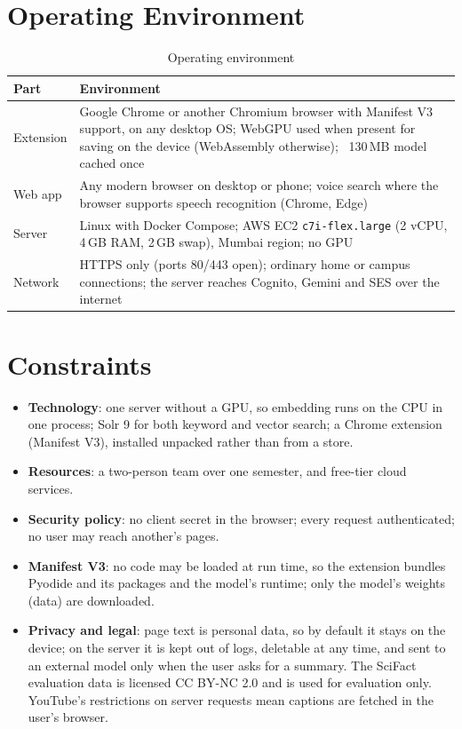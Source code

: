 \section{Operating Environment}

\begin{table}[H]
\centering
\small
\begin{tabularx}{\textwidth}{>{\raggedright\arraybackslash}p{} L}
\toprule
\textbf{Part} & \textbf{Environment} \\
\midrule
Extension & Google Chrome or another Chromium browser with Manifest V3 support, on any desktop OS; WebGPU used when present for saving on the device (WebAssembly otherwise); ~130\,MB model cached once \\
Web app & Any modern browser on desktop or phone; voice search where the browser supports speech recognition (Chrome, Edge) \\
Server & Linux with Docker Compose; AWS EC2 \texttt{c7i-flex.large} (2 vCPU, 4\,GB RAM, 2\,GB swap), Mumbai region; no GPU \\
Network & HTTPS only (ports 80/443 open); ordinary home or campus connections; the server reaches Cognito, Gemini and SES over the internet \\
\bottomrule
\end{tabularx}
\caption{Operating environment}
\label{tab:environment}
\end{table}

\section{Constraints}

\begin{itemize}
  \item \textbf{Technology}: one server without a GPU, so embedding runs on
  the CPU in one process; Solr 9 for both keyword and vector search; a Chrome
  extension (Manifest V3), installed unpacked rather than from a store.
  \item \textbf{Resources}: a two-person team over one semester, and
  free-tier cloud services.
  \item \textbf{Security policy}: no client secret in the browser; every
  request authenticated; no user may reach another's pages.
  \item \textbf{Manifest V3}: no code may be loaded at run time, so the
  extension bundles Pyodide and its packages and the model's runtime; only
  the model's weights (data) are downloaded.
  \item \textbf{Privacy and legal}: page text is personal data, so by default
  it stays on the device; on the server it is kept out of logs, deletable at any time, and
  sent to an external model only when the user asks for a summary. The
  SciFact evaluation data is licensed CC BY-NC 2.0 and is used for evaluation
  only. YouTube's restrictions on server requests mean captions are fetched in
  the user's browser.
\end{itemize}

